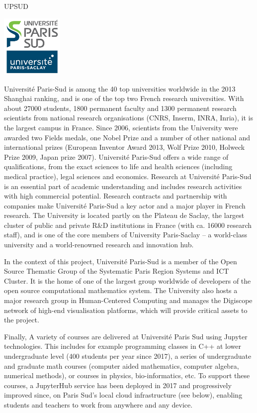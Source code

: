 \begin{sitedescription}{UPSUD} \label{desc:ParisSud}

\begin{center}
\includegraphics[height=3cm]{Participants/Logos/UPSud.png}
\end{center}

Université Paris-Sud is among the 40 top universities worldwide in the
2013 Shanghai ranking, and is one of the top two French research
universities. With about 27000 students, 1800 permanent faculty
and 1300 permanent research scientists from national research
organisations (CNRS, Inserm, INRA, Inria), it is the largest campus in
France. Since 2006, scientists from the University were awarded two
Fields medals, one Nobel Prize and a number of other national and international prizes
(European Inventor Award 2013, Wolf Prize 2010, Holweck Prize 2009,
Japan prize 2007).  Université Paris-Sud offers a
wide range of qualifications, from the exact sciences to life and health
sciences (including medical practice), legal sciences and economics. 
Research at Université Paris-Sud is an essential part of academic understanding 
and includes research activities with high commercial potential. 
Research contracts and partnership with companies make
Université Paris-Sud a key actor and a major player in French
research.  The University is located partly on the Plateau de Saclay,
the largest cluster of public and private R\&D institutions in France
(with ca. 16000 research staff), and is one of the core members of
University Paris-Saclay – a world-class university and a
world-renowned research and innovation hub.

In the context of this project, Université Paris-Sud is a member of
the Open Source Thematic Group of the Systematic Paris Region Systems
and ICT Cluster.
%
It is the home of one of the largest group worldwide of developers of
the open source \Sage computational mathematics system.
%
The University also hosts a major research group in Human-Centered
Computing and manages the Digiscope network of high-end visualisation
platforms, which will provide critical assets to the project.

Finally, A variety of courses are delivered at Université Paris Sud
using Jupyter technologies. This includes for example programming
classes in C++ at lower undergraduate level (400 students per year
since 2017), a series of undergraduate and graduate math courses
(computer aided mathematics, computer algebra, numerical methods), or
courses in physics, bio-informatics, etc. To support these courses, a
JupyterHub service has been deployed in 2017 and progressively
improved since, on Paris Sud's local cloud infrastructure
 (see below), enabling students and teachers to
work from anywhere and any device.


\end{sitedescription}
